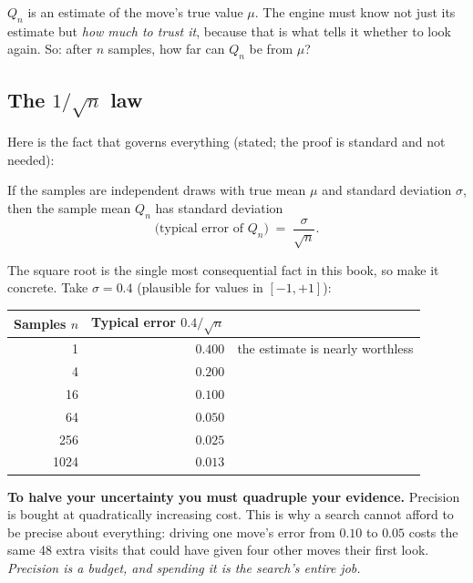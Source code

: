 $Q_n$ is an estimate of the move's true value $\mu$. The engine must know not just its
estimate but \emph{how much to trust it}, because that is what tells it whether to look
again. So: after $n$ samples, how far can $Q_n$ be from $\mu$?

\subsection{The $1/\sqrt{n}$ law}

Here is the fact that governs everything (stated; the proof is standard and not needed):

\begin{established}
If the samples are independent draws with true mean $\mu$ and standard deviation $\sigma$,
then the sample mean $Q_n$ has standard deviation
\begin{equation}
  \label{eq:se}
  \text{(typical error of } Q_n) \;=\; \frac{\sigma}{\sqrt{n}} .
\end{equation}
\end{established}

The square root is the single most consequential fact in this book, so make it concrete.
Take $\sigma = 0.4$ (plausible for values in $[-1,+1]$):

\begin{center}
\begin{tabular}{@{}rrl@{}}
\toprule
Samples $n$ & Typical error $0.4/\sqrt{n}$ & \\
\midrule
1    & $0.400$ & the estimate is nearly worthless \\
4    & $0.200$ & \\
16   & $0.100$ & \\
64   & $0.050$ & \\
256  & $0.025$ & \\
1024 & $0.013$ & \\
\bottomrule
\end{tabular}
\end{center}

\begin{keyidea}
\textbf{To halve your uncertainty you must quadruple your evidence.} Precision is bought at
quadratically increasing cost. This is why a search cannot afford to be precise about
everything: driving one move's error from $0.10$ to $0.05$ costs the same 48 extra visits
that could have given four other moves their first look. \emph{Precision is a budget, and
spending it is the search's entire job.}
\end{keyidea}

